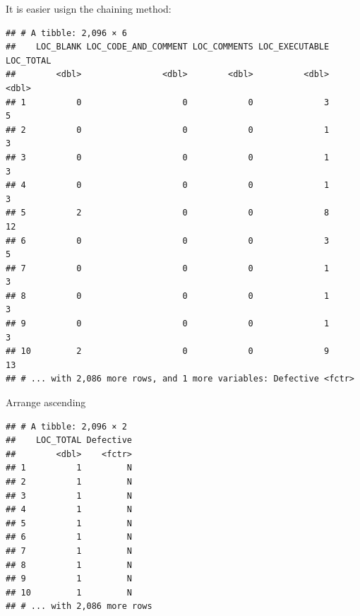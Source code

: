 \documentclass[]{book}
\newenvironment{Shaded}{\begin{snugshade}}{\end{snugshade}}
\newcommand{\KeywordTok}[1]{\textcolor[rgb]{0.13,0.29,0.53}{\textbf{{#1}}}}
\newcommand{\DecValTok}[1]{\textcolor[rgb]{0.00,0.00,0.81}{{#1}}}
\newcommand{\StringTok}[1]{\textcolor[rgb]{0.31,0.60,0.02}{{#1}}}
\newcommand{\CommentTok}[1]{\textcolor[rgb]{0.56,0.35,0.01}{\textit{{#1}}}}
\newcommand{\NormalTok}[1]{{#1}}
\begin{document}
It is easier usign the chaining method:

\begin{Shaded}
\end{Shaded}

\begin{verbatim}
## # A tibble: 2,096 × 6
##    LOC_BLANK LOC_CODE_AND_COMMENT LOC_COMMENTS LOC_EXECUTABLE LOC_TOTAL
##        <dbl>                <dbl>        <dbl>          <dbl>     <dbl>
## 1          0                    0            0              3         5
## 2          0                    0            0              1         3
## 3          0                    0            0              1         3
## 4          0                    0            0              1         3
## 5          2                    0            0              8        12
## 6          0                    0            0              3         5
## 7          0                    0            0              1         3
## 8          0                    0            0              1         3
## 9          0                    0            0              1         3
## 10         2                    0            0              9        13
## # ... with 2,086 more rows, and 1 more variables: Defective <fctr>
\end{verbatim}

Arrange ascending

\begin{Shaded}
\end{Shaded}

\begin{verbatim}
## # A tibble: 2,096 × 2
##    LOC_TOTAL Defective
##        <dbl>    <fctr>
## 1          1         N
## 2          1         N
## 3          1         N
## 4          1         N
## 5          1         N
## 6          1         N
## 7          1         N
## 8          1         N
## 9          1         N
## 10         1         N
## # ... with 2,086 more rows
\end{verbatim}
\end{document}

